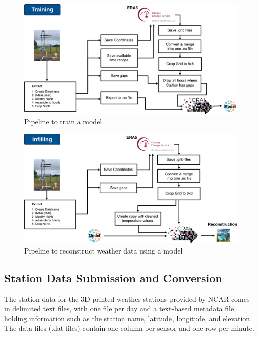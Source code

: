 \begin{figure}
    \centering
    \includegraphics[width=450pt]{resources/images/training_pipeline.png}
    \caption{Pipeline to train a model}
    \label{fig: training_pipeline}
\end{figure}

\begin{figure}
    \centering
    \includegraphics[width=450pt]{resources/images/infilling_pipeline.png}
    \caption{Pipeline to reconstruct weather data using a model}
    \label{fig: infilling_pipeline}
\end{figure}

\subsection{Station Data Submission and Conversion}

The station data for the 3D-printed weather stations provided by NCAR comes in delimited text files, with one file per day and a text-based metadata file holding information such as the station name, latitude, longitude, and elevation. 
The data files (.dat files) contain one column per sensor and one row per minute.

